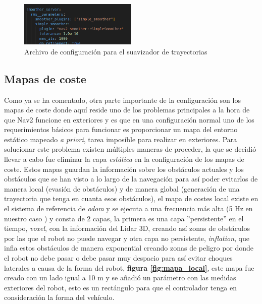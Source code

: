 \begin{figure}[H]
    \centering
    \includegraphics[width=0.5\textwidth]{images/smoother_params.png}
    \caption{Archivo de configuración para el suavizador de trayectorias}
    \label{fig:parametros_smoother_server}
\end{figure}

\subsection{Mapas de coste}
Como ya se ha comentado, otra parte importante de la configuración son los mapas de coste donde aquí reside uno de los problemas principales 
a la hora de que Nav2 funcione en exteriores y es que en una configuración normal uno de los requerimientos básicos para funcionar es proporcionar 
un mapa del entorno estático mapeado \textit{a priori}, tarea imposible para realizar en exteriores. Para solucionar este problema existen múltiples maneras 
de proceder, la que se decidió llevar a cabo fue eliminar la capa \textit{estática} en la configuración de los mapas de coste. Estos mapas guardan la 
información sobre los obstáculos actuales y los obstáculos que se han visto a lo largo de la navegación para así poder evitarlos de manera local (evasión de obstáculos) y 
de manera global (generación de una trayectoria que tenga en cuanta esos obstáculos), el mapa de costes local existe en el sistema de referencia de \textit{odom} y se ejecuta 
a una frecuencia más alta (5 Hz en nuestro caso ) y consta de 2 capas, la primera es una capa ''persistente'' en el tiempo, \textit{voxel}, con la información del Lidar 3D, creando así zonas de obstáculos por 
las que el robot no puede navegar y otra capa no persistente, \textit{inflation}, que infla estos obstáculos de manera exponential creando zonas 
de peligro por donde el robot no debe pasar o debe pasar muy despacio para así evitar choques laterales a causa de la forma del robot, \textbf{figura \ref{fig:mapa_local}}, este 
mapa fue creado con un lado igual a 10 m y se añadió un parámetro con las medidas exteriores del robot, esto es un rectángulo para que el controlador tenga en consideración 
la forma del vehículo.

